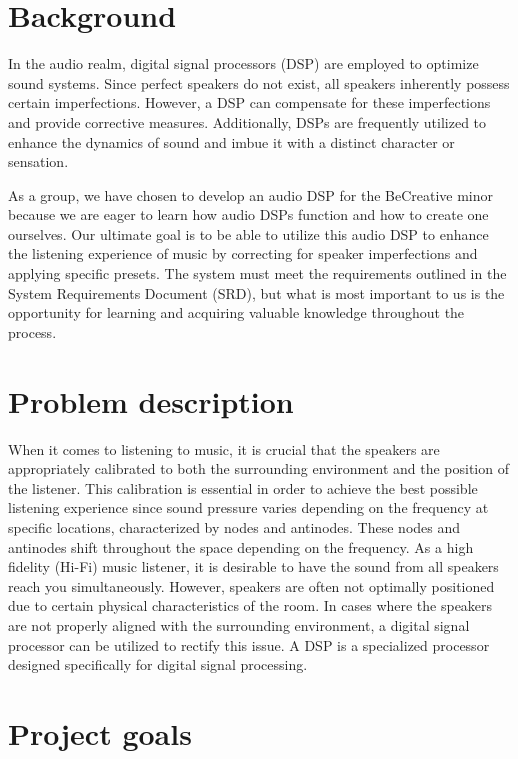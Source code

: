 \section{Background}

\noindent In the audio realm, digital signal processors (DSP) are employed to optimize sound systems. Since perfect speakers do not exist, all speakers inherently possess certain imperfections. However, a DSP can compensate for these imperfections and provide corrective measures. Additionally, DSPs are frequently utilized to enhance the dynamics of sound and imbue it with a distinct character or sensation.

\noindent As a group, we have chosen to develop an audio DSP for the BeCreative minor because we are eager to learn how audio DSPs function and how to create one ourselves. Our ultimate goal is to be able to utilize this audio DSP to enhance the listening experience of music by correcting for speaker imperfections and applying specific presets. The system must meet the requirements outlined in the System Requirements Document (SRD), but what is most important to us is the opportunity for learning and acquiring valuable knowledge throughout the process.


\section{Problem description}

\noindent When it comes to listening to music, it is crucial that the speakers are appropriately calibrated to both the surrounding environment and the position of the listener. This calibration is essential in order to achieve the best possible listening experience since sound pressure varies depending on the frequency at specific locations, characterized by nodes and antinodes. These nodes and antinodes shift throughout the space depending on the frequency. As a high fidelity (Hi-Fi) music listener, it is desirable to have the sound from all speakers reach you simultaneously. However, speakers are often not optimally positioned due to certain physical characteristics of the room. In cases where the speakers are not properly aligned with the surrounding environment, a digital signal processor can be utilized to rectify this issue. A DSP is a specialized processor designed specifically for digital signal processing.

\section{Project goals}

